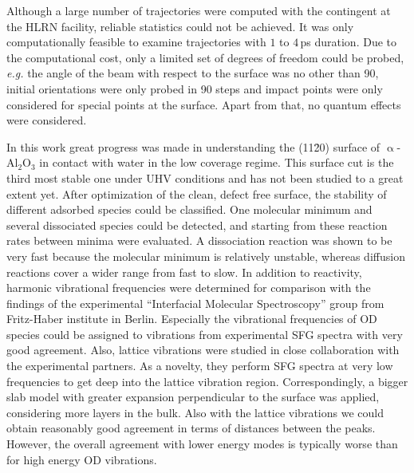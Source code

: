 \documentclass[11pt,DIV=13,BCOR=5mm,a4paper,headinclude]{scrbook}
\begin{document}
Although a large number of trajectories were computed with the contingent at the HLRN facility, reliable statistics could not be achieved.
It was only computationally feasible to examine trajectories with $1$ to $4\,$ps duration.
Due to the computational cost, only a limited set of degrees of freedom could be probed, \textit{e.g.} the angle of the beam with respect to the surface was no other than 90\textdegree{}, initial orientations were only probed in 90\textdegree{} steps and impact points were only considered for special points at the surface.
Apart from that, no quantum effects were considered.
\clearpage



In this work great progress was made in understanding the (11\=20) surface of $\upalpha$-Al$_2$O$_3$ in contact with water in the low coverage regime.
This surface cut is the third most stable one under UHV conditions and has not been studied to a great extent yet.
After optimization of the clean, defect free surface, the stability of different adsorbed species could be classified.
One molecular minimum and several dissociated species could be detected, and starting from these reaction rates between minima were evaluated.
A dissociation reaction was shown to be very fast because the molecular minimum is relatively unstable, whereas diffusion reactions cover a wider range from fast to slow.
In addition to reactivity, harmonic vibrational frequencies were determined for comparison with the findings of the experimental ``Interfacial Molecular Spectroscopy'' group  from Fritz-Haber institute in Berlin.
Especially the vibrational frequencies of OD species could be assigned to vibrations from experimental SFG spectra with very good agreement.
Also, lattice vibrations were studied in close collaboration with the experimental partners.
As a novelty, they perform SFG spectra at very low frequencies to get deep into the lattice vibration region.
Correspondingly, a bigger slab model with greater expansion perpendicular to the surface was applied, considering more layers in the bulk.
Also with the lattice vibrations we could obtain reasonably good agreement in terms of distances between the peaks.
However, the overall agreement with lower energy modes is typically worse than for high energy OD vibrations.
\\\\
\end{document}
